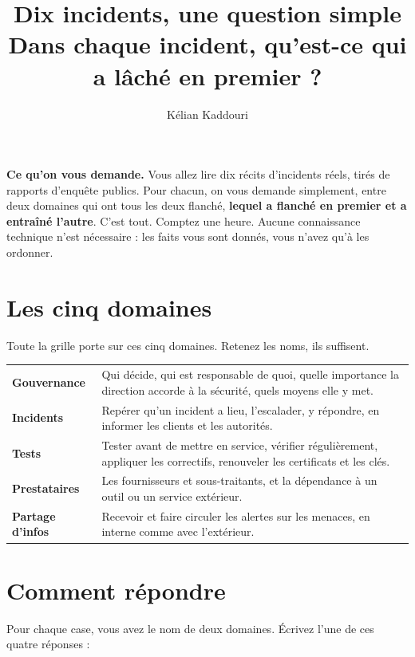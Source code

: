 \documentclass[11pt,a4paper]{article}
\title{\vspace{-1.2cm}\color{navy}\bfseries Dix incidents, une question simple\\[2pt]
  \large Dans chaque incident, qu'est-ce qui a lâché en premier ?}
\author{Kélian Kaddouri}
\date{}
\begin{document}
\maketitle
\vspace{-1.1cm}

\begin{cle}
\textbf{Ce qu'on vous demande.} Vous allez lire dix récits d'incidents réels, tirés de rapports
d'enquête publics. Pour chacun, on vous demande simplement, entre deux domaines qui ont tous les
deux flanché, \textbf{lequel a flanché en premier et a entraîné l'autre}. C'est tout. Comptez
une heure. Aucune connaissance technique n'est nécessaire : les faits vous sont
donnés, vous n'avez qu'à les ordonner.
\end{cle}

\section*{Les cinq domaines}

Toute la grille porte sur ces cinq domaines. Retenez les noms, ils suffisent.

\begin{center}
\renewcommand{\arraystretch}{1.35}
\begin{tabular}{@{}>{\bfseries}p{3.1cm} p{13.2cm}@{}}
\toprule
Gouvernance & Qui décide, qui est responsable de quoi, quelle importance la direction accorde à
la sécurité, quels moyens elle y met. \\
Incidents & Repérer qu'un incident a lieu, l'escalader, y répondre, en informer les clients et
les autorités. \\
Tests & Tester avant de mettre en service, vérifier régulièrement, appliquer les correctifs,
renouveler les certificats et les clés. \\
Prestataires & Les fournisseurs et sous-traitants, et la dépendance à un outil ou un service
extérieur. \\
Partage d'infos & Recevoir et faire circuler les alertes sur les menaces, en interne comme avec
l'extérieur. \\
\bottomrule
\end{tabular}
\end{center}

\section*{Comment répondre}

Pour chaque case, vous avez le nom de deux domaines. Écrivez l'une de ces quatre réponses :
\end{document}
